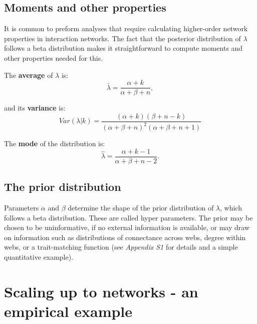 \documentclass[12pt]{article}
\begin{document}
\begin{spacing}{2.0}
    \subsection*{Moments and other properties}

      It is common to preform analyses that require calculating higher-order network properties in interaction networks. The fact that the posterior distribution of $\lambda$ follows a beta distribution makes it straightforward to compute moments and other properties needed for this. 


      The \textbf{average} of $\lambda$ is: 
          \begin{equation}
            \bar{\lambda} = \frac{\alpha+k}{\alpha+\beta+n} ,
            \label{mean}
          \end{equation}

        and its \textbf{variance} is:  
          \begin{equation}
            Var(\lambda|k) = \frac{(\alpha + k)(\beta + n - k)}{(\alpha + \beta + n)^{2}(\alpha + \beta + n +1)}
            \label{variance}
          \end{equation}

        The \textbf{mode} of the distribution is:
          \begin{equation}
            \hat{\lambda} = \frac{\alpha + k - 1}{\alpha + \beta + n - 2} .
            \label{mode}
          \end{equation}

    \subsection*{The prior distribution}    

      Parameters $\alpha$ and $\beta$ determine the shape of the prior distribution of $\lambda$, which follows a beta distribution. These are called hyper parameters. The prior may be chosen to be uninformative, if no external information is available, or may draw on information such as distributions of connectance across webs, degree within webs, or a trait-matching function (see \emph{Appendix S1} for details and a simple quantitative example).


\section*{Scaling up to networks - an empirical example}



\end{spacing}
\end{document}
